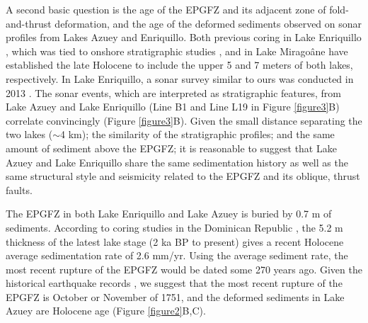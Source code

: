\documentclass[man,natbib]{apa6}
\begin{document}
A second basic question is the age of the EPGFZ and its adjacent zone of fold-and-thrust deformation, and the age of the deformed sediments observed on sonar profiles from Lakes Azuey and Enriquillo. Both previous coring in Lake Enriquillo \citep{rios2013holocene}, which was tied to onshore stratigraphic studies \citep{taylor1985stratigraphy,rios2013holocene}, and in Lake Mirago\^ane \citep{higuera199910} have established the late Holocene to include the upper 5 and 7 meters of both lakes, respectively. In Lake Enriquillo, a sonar survey similar to ours was conducted in 2013 \citep{rios2013holocene}. The sonar events, which are interpreted as stratigraphic features, from Lake Azuey and Lake Enriquillo (Line B1 and Line L19 in Figure \ref{figure3}B) correlate convincingly (Figure \ref{figure3}B). Given the small distance separating the two lakes ($\sim$4 km); the similarity of the stratigraphic profiles; and the same amount of sediment above the EPGFZ; it is reasonable to suggest that Lake Azuey and Lake Enriquillo share the same sedimentation history as well as the same structural style and seismicity related to the EPGFZ and its oblique, thrust faults.

The EPGFZ in both Lake Enriquillo and Lake Azuey is buried by 0.7 m of sediments. According to coring studies in the Dominican Republic \citep{taylor1985stratigraphy,rios2013holocene}, the 5.2 m thickness of the latest lake stage (2 ka BP to present) gives a recent Holocene average sedimentation rate of 2.6 mm/yr. Using the average sediment rate, the most recent rupture of the EPGFZ would be dated some 270 years ago. Given the historical earthquake records \citep{bakun2012significant}, we suggest that the most recent rupture of the EPGFZ is October or November of 1751, and the deformed sediments in Lake Azuey are Holocene age (Figure \ref{figure2}B,C). 
%
\end{document}
